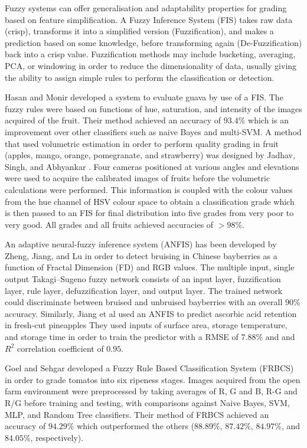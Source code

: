 \documentclass[fleqn,twoside,12pt]{report}
\begin{document}
Fuzzy systems can offer generalisation and adaptability properties for grading based on feature simplification. A Fuzzy Inference System (FIS) takes raw data (crisp), transforms it into a simplified version (Fuzzification), and makes a prediction based on some knowledge, before transforming again (De-Fuzzification) back into a crisp value. Fuzzification methods may include bucketing, averaging, PCA, or windowing in order to reduce the dimensionality of data, usually giving the ability to assign simple rules to perform the classification or detection.

Hasan and Monir \cite{hasan} developed a system to evaluate guava by use of a FIS. The fuzzy rules were based on functions of hue, saturation, and intensity of the images acquired of the fruit. Their method achieved an accuracy of $93.4\%$ which is an improvement over other classifiers such as naive Bayes and multi-SVM. A method that used volumetric estimation in order to perform quality grading in fruit (apples, mango, orange, pomegranate, and strawberry) was designed by Jadhav, Singh, and Abhyankar \cite{jadhav}. Four cameras positioned at various angles and elevations were used to acquire the calibrated images of fruits before the volumetric calculations were performed. This information is coupled with the colour values from the hue channel of HSV colour space to obtain a classification grade which is then passed to an FIS for final distribution into five grades from very poor to very good. All grades and all fruits achieved accuracies of $>98\%$. 

An adaptive neural-fuzzy inference system (ANFIS) has been developed by Zheng, Jiang, and Lu \cite{zheng} in order to detect bruising in Chinese bayberries as a function of Fractal Dimension (FD) and RGB values. The multiple input, single output Takagi–Sugeno fuzzy network consists of an input layer, fuzzification layer, rule layer, defuzzification layer, and output layer. The trained network could discriminate between bruised and unbruised bayberries with an overall $90\%$ accuracy. Similarly, Jiang et al \cite{jiang} used an ANFIS to predict ascorbic acid retention in fresh-cut pineapples They used inputs of surface area, storage temperature, and storage time in order to train the predictor with a RMSE of $7.88\%$ and and $R^2$ correlation coefficient of $0.95$.

Goel and Sehgar \cite{goel} developed a Fuzzy Rule Based Classification System (FRBCS) in order to grade tomatos into six ripeness stages. Images acquired from the open farm environment were preprocessed by taking averages of R, G and B, R-G and R/G before training and testing, with comparisons against Naive Bayes, SVM, MLP, and Random Tree classifiers. Their method of FRBCS achieved an accuracy of $94.29\%$ which outperformed the others ($88.89\%$, $87.42\%$, $84.97\%$, and $84.05\%$, respectively).  
\end{document}
